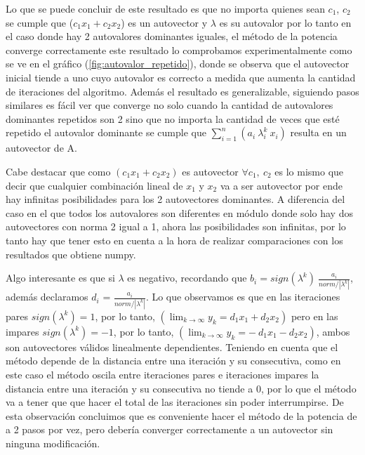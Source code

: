 Lo que se puede concluir de este resultado es que no importa quienes sean $c_1$, $c_2$ se cumple que ($c_1 x_1 + c_2 x_2$) es un autovector y $\lambda$ es su autovalor por lo tanto en el caso donde hay 2 autovalores dominantes iguales, el método de la potencia converge correctamente este resultado lo comprobamos experimentalmente como se ve en el gráfico (\ref{fig:autovalor_repetido}), donde se observa que el autovector inicial tiende a uno cuyo autovalor es correcto a medida que aumenta la cantidad de iteraciones del algoritmo. Además el resultado es generalizable, siguiendo pasos similares es fácil ver que converge no solo cuando la cantidad de autovalores dominantes repetidos son 2 sino que no importa la cantidad de veces que esté repetido el autovalor dominante se cumple que $\sum_{i=1}^{n} (a_i \ \lambda_{i}^{k} \ x_i)$ resulta en un autovector de A.

\vspace{1em}

Cabe destacar que como $(c_1 x_1 + c_2 x_2)$ es autovector $\forall c_1, \ c_2$ es lo mismo que decir que cualquier combinación lineal de $x_1$ y $x_2$ va a ser autovector por ende hay infinitas posibilidades para los 2 autovectores dominantes. A diferencia del caso en el que todos los autovalores son diferentes en módulo donde solo hay dos autovectores con norma 2 igual a 1, ahora las posibilidades son infinitas, por lo tanto hay que tener esto en cuenta a la hora de realizar comparaciones con los resultados que obtiene numpy. 

\vspace{1em}


Algo interesante es que si $\lambda$ es negativo, recordando que $b_i = sign(\lambda^{k}) \ \frac{a_i}{norm / |\lambda^{k}|}$, además declaramos $d_i$ = $\frac{a_i}{norm / |\lambda^{k}|}$. Lo que observamos es que en las iteraciones pares $sign(\lambda^{k}) = 1$, por lo tanto, $(\lim_{k \to \infty} y_k = d_1 x_1 + d_2 x_2)$ pero en las impares $sign(\lambda^{k}) = -1$, por lo tanto, $(\lim_{k \to \infty} y_k = - \ d_1 x_1 -d_2 x_2)$, ambos son autovectores válidos linealmente dependientes. Teniendo en cuenta que el método depende de la distancia entre una iteración y su consecutiva, como en este caso el método oscila entre iteraciones pares e iteraciones impares la distancia entre una iteración y su consecutiva no tiende a 0, por lo que el método va a tener que que hacer el total de las iteraciones sin poder interrumpirse. De esta observación concluimos que es conveniente hacer el método de la potencia de a 2 pasos por vez, pero debería converger correctamente a un autovector sin ninguna modificación.

